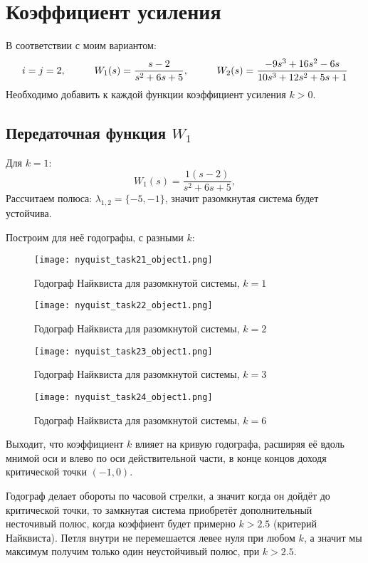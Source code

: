 \chapter{Коэффициент усиления}
\label{ch:chap2}

В соответствии с моим вариантом:
$$
    i=j=2, \hspace*{1cm} W_1(s) = \frac{s-2}{s^2+6s+5}, \hspace*{1cm} W_2(s) = \frac{-9s^3+16s^2-6s}{10s^3+12s^2+5s+1}
$$
Необходимо добавить к каждой функции коэффициент усиления $k > 0$.

\section{Передаточная функция $W_1$}
Для $k=1$:
$$
W_1(s) = \frac{1(s-2)}{s^2+6s+5},
$$
Рассчитаем полюса: $\lambda_{1,2} = \{-5, -1 \}$, значит разомкнутая система будет устойчива. 

Построим для неё годографы, с разными $k$:
\begin{figure}[ht]
    \centering
    \texttt{[image: nyquist\_task21\_object1.png]}
    \caption{Годограф Найквиста для разомкнутой системы, $k=1$}
\end{figure}
\begin{figure}[ht]
    \centering
    \texttt{[image: nyquist\_task22\_object1.png]}
    \caption{Годограф Найквиста для разомкнутой системы, $k=2$}
\end{figure}
\begin{figure}[ht]
    \centering
    \texttt{[image: nyquist\_task23\_object1.png]}
    \caption{Годограф Найквиста для разомкнутой системы, $k=3$}
\end{figure}
\begin{figure}[ht]
    \centering
    \texttt{[image: nyquist\_task24\_object1.png]}
    \caption{Годограф Найквиста для разомкнутой системы, $k=6$}
\end{figure}

Выходит, что коэффициент $k$ влияет на кривую годографа, расширяя её вдоль мнимой оси и влево по оси действительной части, в конце концов 
доходя критической точки $(-1,0)$.

Годограф делает обороты по часовой стрелки, а значит когда он дойдёт до критической точки, то замкнутая система приобретёт дополнительный несточивый полюс, когда коэффиент будет примерно $k > 2.5$ (критерий Найквиста).
Петля внутри не перемешается левее нуля при любом $k$, а значит мы максимум получим только один неустойчивый полюс, при $k > 2.5$.

